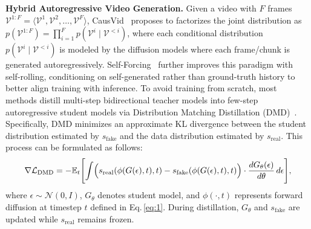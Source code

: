 \documentclass{llmxive}
\begin{document}
\noindent
\textbf{Hybrid Autoregressive Video Generation.}
% 
Given a video with $F$ frames $\mathcal{V}^{1:F} = \langle \mathcal{V}^1, \mathcal{V}^2, \ldots, \mathcal{V}^F \rangle$, CausVid~\cite{yin2025slow} proposes to factorizes the joint distribution as $p(\mathcal{V}^{1:F}) = \prod_{i=1}^{F} p(\mathcal{V}^{i} \mid \mathcal{V}^{<i})$, where each conditional distribution $p(\mathcal{V}^{i} \mid \mathcal{V}^{<i})$ is modeled by the diffusion models where each frame/chunk is generated autoregressively.
% 
Self-Forcing~\cite{huang2025self} further improves this paradigm with self-rolling, conditioning on self-generated rather than ground-truth history to better align training with inference.
% 
To avoid training from scratch, most methods distill multi-step bidirectional teacher models into few-step autoregressive student models via Distribution Matching Distillation (DMD)~\cite{yin2024improved}.
% 
Specifically, DMD minimizes an approximate KL divergence between the student distribution estimated by $s_{\text{fake}}$ and the data distribution estimated by $s_{\text{real}}$. This process can be formulated as follows:
% 
\begin{equation}
\nabla \mathcal{L}_{\text{DMD}} = - \mathbb{E}_{t} \Biggl[ 
    \int \Bigl( 
        s_{\text{real}}(\phi(G(\epsilon), t), t) - s_{\text{fake}}(\phi(G(\epsilon), t), t) 
    \Bigr) \cdot \frac{d G_{\theta}(\epsilon)}{d\theta} \, d\epsilon
\Biggr],
\label{eq:3}
\end{equation}
% 
where $\epsilon \sim  \mathcal{N}(0, I)$, $G_{\theta}$ denotes student model, and $\phi(\cdot,t)$ represents forward diffusion at timestep $t$ defined in Eq.\,\ref{eq:1}.
During distillation, $G_{\theta}$ and $s_{\text{fake}}$ are updated while $s_{\text{real}}$ remains frozen.
\end{document}

